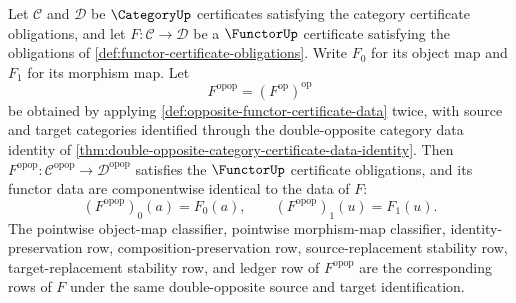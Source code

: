 \begin{theorem}
\label{thm:double-opposite-functor-certificate-data-identity}
Let $\mathcal C$ and $\mathcal D$ be $\CategoryUp$ certificates satisfying the category certificate obligations, and let $F:\mathcal C\to\mathcal D$ be a $\FunctorUp$ certificate satisfying the obligations of \autoref{def:functor-certificate-obligations}. Write $F_0$ for its object map and $F_1$ for its morphism map. Let
$$
F^{\mathrm{opop}}=(F^{\mathrm{op}})^{\mathrm{op}}
$$
be obtained by applying \autoref{def:opposite-functor-certificate-data} twice, with source and target categories identified through the double-opposite category data identity of \autoref{thm:double-opposite-category-certificate-data-identity}. Then $F^{\mathrm{opop}}:\mathcal C^{\mathrm{opop}}\to\mathcal D^{\mathrm{opop}}$ satisfies the $\FunctorUp$ certificate obligations, and its functor data are componentwise identical to the data of $F$:
$$
(F^{\mathrm{opop}})_0(a)=F_0(a),
\qquad
(F^{\mathrm{opop}})_1(u)=F_1(u).
$$
The pointwise object-map classifier, pointwise morphism-map classifier, identity-preservation row, composition-preservation row, source-replacement stability row, target-replacement stability row, and ledger row of $F^{\mathrm{opop}}$ are the corresponding rows of $F$ under the same double-opposite source and target identification.
\end{theorem}
